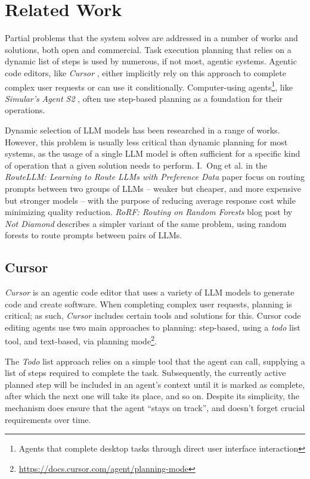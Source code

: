 \documentclass[a4paper,11pt,twoside]{report}
\theoremstyle{definition}
\begin{document}
\chapter{Related Work}

Partial problems that the system solves are addressed in a number of works and solutions, both open and commercial. Task execution planning that relies on a dynamic list of steps is used by numerous, if not most, agentic systems. Agentic code editors, like \textit{Cursor} \cite{cursor2024}, either implicitly rely on this approach to complete complex user requests or can use it conditionally. Computer-using agents\footnote{Agents that complete desktop tasks through direct user interface interaction}, like \textit{Simular's} \textit{Agent S2} \cite{agashe2025agents2}, often use step-based planning as a foundation for their operations. 

Dynamic selection of LLM models has been researched in a range of works. However, this problem is usually less critical than dynamic planning for most systems, as the usage of a single LLM model is often sufficient for a specific kind of operation that a given solution needs to perform. I.~Ong et al. in the \textit{RouteLLM: Learning to Route LLMs with Preference Data} \cite{ong2025routellm} paper focus on routing prompts between two groups of LLMs -- weaker but cheaper, and more expensive but stronger models -- with the purpose of reducing average response cost while minimizing quality reduction. \textit{RoRF: Routing on Random Forests} blog post by \textit{Not Diamond} \cite{notdiamond2024rorf} describes a simpler variant of the same problem, using random forests to route prompts between pairs of LLMs. 

\section{Cursor}

\textit{Cursor} is an agentic code editor that uses a variety of LLM models to generate code and create software. When completing complex user requests, planning is critical; as such, \textit{Cursor} includes certain tools and solutions for this. Cursor code editing agents use two main approaches to planning: step-based, using a \textit{todo} list tool, and text-based, via planning mode\footnote{\url{https://docs.cursor.com/agent/planning-mode}}.

The \textit{Todo} list approach relies on a simple tool that the agent can call, supplying a list of steps required to complete the task. Subsequently, the currently active planned step will be included in an agent's context until it is marked as complete, after which the next one will take its place, and so on. Despite its simplicity, the mechanism does ensure that the agent ``stays on track'', and doesn't forget crucial requirements over time. 
\end{document}
